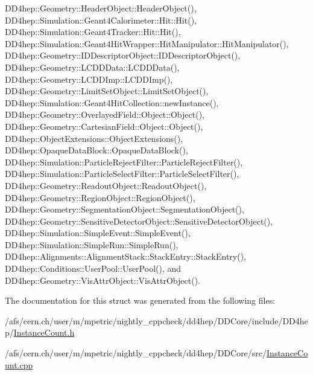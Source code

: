 DD4hep::Geometry::HeaderObject::HeaderObject(), DD4hep::Simulation::Geant4Calorimeter::Hit::Hit(), DD4hep::Simulation::Geant4Tracker::Hit::Hit(), DD4hep::Simulation::Geant4HitWrapper::HitManipulator::HitManipulator(), DD4hep::Geometry::IDDescriptorObject::IDDescriptorObject(), DD4hep::Geometry::LCDDData::LCDDData(), DD4hep::Geometry::LCDDImp::LCDDImp(), DD4hep::Geometry::LimitSetObject::LimitSetObject(), DD4hep::Simulation::Geant4HitCollection::newInstance(), DD4hep::Geometry::OverlayedField::Object::Object(), DD4hep::Geometry::CartesianField::Object::Object(), DD4hep::ObjectExtensions::ObjectExtensions(), DD4hep::OpaqueDataBlock::OpaqueDataBlock(), DD4hep::Simulation::ParticleRejectFilter::ParticleRejectFilter(), DD4hep::Simulation::ParticleSelectFilter::ParticleSelectFilter(), DD4hep::Geometry::ReadoutObject::ReadoutObject(), DD4hep::Geometry::RegionObject::RegionObject(), DD4hep::Geometry::SegmentationObject::SegmentationObject(), DD4hep::Geometry::SensitiveDetectorObject::SensitiveDetectorObject(), DD4hep::Simulation::SimpleEvent::SimpleEvent(), DD4hep::Simulation::SimpleRun::SimpleRun(), DD4hep::Alignments::AlignmentStack::StackEntry::StackEntry(), DD4hep::Conditions::UserPool::UserPool(), and DD4hep::Geometry::VisAttrObject::VisAttrObject().

The documentation for this struct was generated from the following files:\begin{DoxyCompactItemize}
\item 
/afs/cern.ch/user/m/mpetric/nightly\_\-cppcheck/dd4hep/DDCore/include/DD4hep/\hyperlink{_instance_count_8h}{InstanceCount.h}\item 
/afs/cern.ch/user/m/mpetric/nightly\_\-cppcheck/dd4hep/DDCore/src/\hyperlink{_instance_count_8cpp}{InstanceCount.cpp}\end{DoxyCompactItemize}
